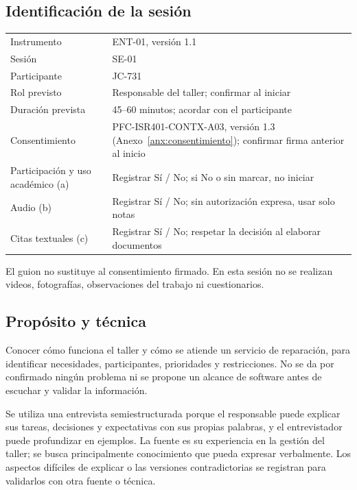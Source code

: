 
\subsection*{Identificaci\'on de la sesi\'on}
\noindent\begin{tabularx}{\linewidth}{@{}L{5cm}Y@{}}
  \toprule
  Instrumento & ENT-01, versi\'on 1.1 \\
  Sesi\'on & SE-01 \\
  Participante & JC-731 \\
  Rol previsto & Responsable del taller; confirmar al iniciar \\
  Duraci\'on prevista & 45--60 minutos; acordar con el participante \\
  Consentimiento & PFC-ISR401-CONTX-A03, versi\'on 1.3 (Anexo~\ref{anx:consentimiento}); confirmar firma anterior al inicio \\
  Participaci\'on y uso acad\'emico (a) & Registrar S\'i / No; si No o sin marcar, no iniciar \\
  Audio (b) & Registrar S\'i / No; sin autorizaci\'on expresa, usar solo notas \\
  Citas textuales (c) & Registrar S\'i / No; respetar la decisi\'on al elaborar documentos \\
  \bottomrule
\end{tabularx}

\medskip
El guion no sustituye al consentimiento firmado. En esta sesi\'on no se realizan videos,
fotograf\'ias, observaciones del trabajo ni cuestionarios.

\subsection*{Prop\'osito y t\'ecnica}
Conocer c\'omo funciona el taller y c\'omo se atiende un servicio de reparaci\'on, para identificar
necesidades, participantes, prioridades y restricciones. No se da por confirmado ning\'un problema
ni se propone un alcance de software antes de escuchar y validar la informaci\'on.

Se utiliza una entrevista semiestructurada porque el responsable puede explicar sus tareas,
decisiones y expectativas con sus propias palabras, y el entrevistador puede profundizar en
ejemplos. La fuente es su experiencia en la gesti\'on del taller; se busca principalmente
conocimiento que pueda expresar verbalmente. Los aspectos dif\'iciles de explicar o las versiones
contradictorias se registran para validarlos con otra fuente o t\'ecnica.

